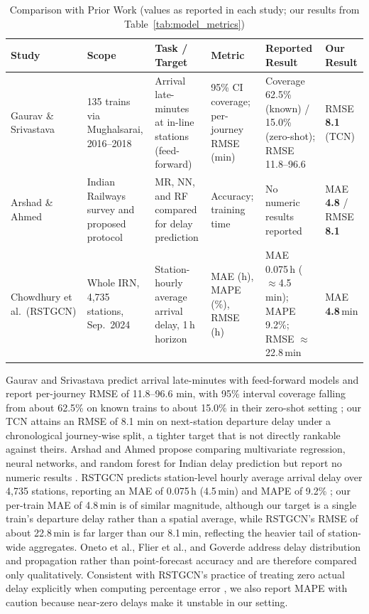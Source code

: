 \documentclass[conference]{IEEEtran}
\begin{document}
\begin{table}[!t]
\centering
\caption{Comparison with Prior Work (values as reported in each study; our results from Table~\ref{tab:model_metrics})}
\label{tab:prior_comparison}
\scriptsize
\setlength{\tabcolsep}{3pt}
\renewcommand{\arraystretch}{0.9}
\begin{tabular}{@{}p{2.2cm}p{2.4cm}p{3.3cm}p{2.3cm}p{3.6cm}p{2.7cm}@{}}
\toprule
Study & Scope & Task / Target & Metric & Reported Result & Our Result \\
\midrule
Gaurav \& Srivastava \cite{gaurav2018zeroshot} & 135 trains via Mughalsarai, 2016--2018 & Arrival late-minutes at in-line stations (feed-forward) & 95\% CI coverage; per-journey RMSE (min) & Coverage 62.5\% (known) / 15.0\% (zero-shot); RMSE 11.8--96.6 & RMSE \textbf{8.1} (TCN) \\
Arshad \& Ahmed \cite{arshad2019prediction} & Indian Railways survey and proposed protocol & MR, NN, and RF compared for delay prediction & Accuracy; training time & No numeric results reported & MAE \textbf{4.8} / RMSE \textbf{8.1} \\
Chowdhury et al.\ (RSTGCN) \cite{chowdhury2025rstgcn} & Whole IRN, 4{,}735 stations, Sep.\ 2024 & Station-hourly average arrival delay, 1\,h horizon & MAE (h), MAPE (\%), RMSE (h) & MAE 0.075\,h ($\approx$4.5\,min); MAPE 9.2\%; RMSE $\approx$22.8\,min & MAE \textbf{4.8}\,min \\
\bottomrule
\end{tabular}
\end{table}

Gaurav and Srivastava predict arrival late-minutes with feed-forward models and report per-journey RMSE of 11.8--96.6 min, with 95\% interval coverage falling from about 62.5\% on known trains to about 15.0\% in their zero-shot setting \cite{gaurav2018zeroshot}; our TCN attains an RMSE of 8.1 min on next-station departure delay under a chronological journey-wise split, a tighter target that is not directly rankable against theirs. Arshad and Ahmed propose comparing multivariate regression, neural networks, and random forest for Indian delay prediction but report no numeric results \cite{arshad2019prediction}. RSTGCN predicts station-level hourly average arrival delay over 4{,}735 stations, reporting an MAE of 0.075\,h (4.5\,min) and MAPE of 9.2\% \cite{chowdhury2025rstgcn}; our per-train MAE of 4.8\,min is of similar magnitude, although our target is a single train's departure delay rather than a spatial average, while RSTGCN's RMSE of about 22.8\,min is far larger than our 8.1\,min, reflecting the heavier tail of station-wide aggregates. Oneto et al., Flier et al., and Goverde \cite{oneto2018train,flier2009delay,goverde2010railway} address delay distribution and propagation rather than point-forecast accuracy and are therefore compared only qualitatively. Consistent with RSTGCN's practice of treating zero actual delay explicitly when computing percentage error \cite{chowdhury2025rstgcn}, we also report MAPE with caution because near-zero delays make it unstable in our setting.
\end{document}
